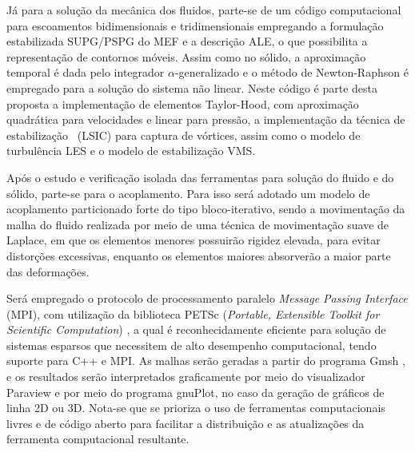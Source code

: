 Já para a solução da mecânica dos fluidos, parte-se de um código computacional para escoamentos bidimensionais e tridimensionais empregando a formulação estabilizada SUPG/PSPG do MEF e a descrição ALE, o que possibilita a representação de contornos móveis. Assim como no sólido, a aproximação temporal é dada pelo integrador $\alpha$-generalizado e o método de Newton-Raphson é empregado para a solução do sistema não linear. Neste código é parte desta proposta a implementação de elementos Taylor-Hood, com aproximação quadrática para velocidades e linear para pressão, a implementação da técnica de estabilização \LSIC\ (LSIC) para captura de vórtices, assim como o modelo de turbulência LES e o modelo de estabilização VMS.

Após o estudo e verificação isolada das ferramentas para solução do fluido e do sólido, parte-se para o acoplamento. Para isso será adotado um modelo de acoplamento particionado forte do tipo bloco-iterativo, sendo a movimentação da malha do fluido realizada por meio de uma técnica de movimentação suave de Laplace, em que os elementos menores possuirão rigidez elevada, para evitar distorções excessivas, enquanto os elementos maiores absorverão a maior parte das deformações.

Será empregado o protocolo de processamento paralelo \textit{Message Passing Interface} (MPI), com utilização da biblioteca PETSc (\textit{Portable, Extensible Toolkit for Scientific Computation}) \cite{petsc-web-page}, a qual é reconhecidamente eficiente para solução de sistemas esparsos que necessitem de alto desempenho computacional, tendo suporte para C++ e MPI.  As malhas serão geradas a partir do programa Gmsh \cite{geuzaine2009gmsh}, e os resultados serão interpretados graficamente por meio do visualizador Paraview \cite{ahrens2005paraview} e por meio do programa gnuPlot, no caso da geração de gráficos de linha 2D ou 3D. Nota-se que se prioriza o uso de ferramentas computacionais livres e de código aberto para facilitar a distribuição e as atualizações da ferramenta computacional resultante.